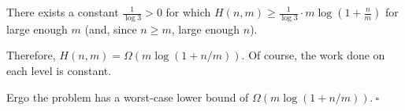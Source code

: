 \begin{enumerate}
\begin{solution}
There exists a constant $\frac{1}{\log{3}}>0$ for which $H(n,m)\geq\frac{1}{\log{3}}\cdot m\log\left(1+\frac{n}{m}\right)$ for large enough $m$ (and, since $n\geq m$, large enough $n$).

Therefore, $H(n,m)=\Omega(m\log(1+n/m))$. Of course, the work done on each level is constant.

Ergo the problem has a worst-case lower bound of $\Omega(m\log(1+n/m)).~\square$
\end{solution}
\end{enumerate}